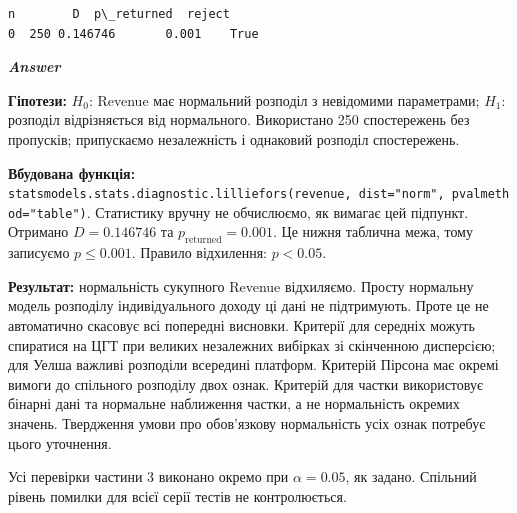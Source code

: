 \documentclass[11pt]{article}
\begin{document}
    
    \begin{Verbatim}[commandchars=\\\{\}]
     n        D  p\_returned  reject
0  250 0.146746       0.001    True
    \end{Verbatim}

    
    \textbf{\emph{Answer}}

\textbf{Гіпотези:} \(H_0\): Revenue має нормальний розподіл з невідомими
параметрами; \(H_1\): розподіл відрізняється від нормального.
Використано 250 спостережень без пропусків; припускаємо незалежність і
однаковий розподіл спостережень.

\textbf{Вбудована функція:}
\texttt{statsmodels.stats.diagnostic.lilliefors(revenue,\ dist="norm",\ pvalmethod="table")}.
Статистику вручну не обчислюємо, як вимагає цей підпункт. Отримано
\(D=0.146746\) та \(p_{\mathrm{returned}}=0.001\). Це нижня таблична
межа, тому записуємо \(p\le0.001\). Правило відхилення: \(p<0.05\).

\textbf{Результат:} нормальність сукупного Revenue відхиляємо. Просту
нормальну модель розподілу індивідуального доходу ці дані не
підтримують. Проте це не автоматично скасовує всі попередні висновки.
Критерії для середніх можуть спиратися на ЦГТ при великих незалежних
вибірках зі скінченною дисперсією; для Уелша важливі розподіли всередині
платформ. Критерій Пірсона має окремі вимоги до спільного розподілу двох
ознак. Критерій для частки використовує бінарні дані та нормальне
наближення частки, а не нормальність окремих значень. Твердження умови
про обов'язкову нормальність усіх ознак потребує цього уточнення.

Усі перевірки частини 3 виконано окремо при \(\alpha=0.05\), як задано.
Спільний рівень помилки для всієї серії тестів не контролюється.


    
    
    
\end{document}
